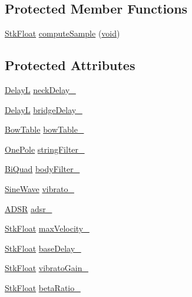 \subsection*{Protected Member Functions}
\begin{DoxyCompactItemize}
\item 
\hyperlink{namespace_nyq_a044fa20a706520a617bbbf458a7db7e4}{Stk\+Float} \hyperlink{class_nyq_1_1_bowed_a879b9d440f72f44acda7f54dba3a1b71}{compute\+Sample} (\hyperlink{sound_8c_ae35f5844602719cf66324f4de2a658b3}{void})
\end{DoxyCompactItemize}
\subsection*{Protected Attributes}
\begin{DoxyCompactItemize}
\item 
\hyperlink{class_nyq_1_1_delay_l}{DelayL} \hyperlink{class_nyq_1_1_bowed_aa170223b11caa79fa4fd5af028eeeff8}{neck\+Delay\+\_\+}
\item 
\hyperlink{class_nyq_1_1_delay_l}{DelayL} \hyperlink{class_nyq_1_1_bowed_a0dc60cfb71d8051ffb776892a16b0361}{bridge\+Delay\+\_\+}
\item 
\hyperlink{class_nyq_1_1_bow_table}{Bow\+Table} \hyperlink{class_nyq_1_1_bowed_ad472d5c094c51eb451599f906e63626d}{bow\+Table\+\_\+}
\item 
\hyperlink{class_nyq_1_1_one_pole}{One\+Pole} \hyperlink{class_nyq_1_1_bowed_a3eb5d4a82da3fbc6df9936facc887296}{string\+Filter\+\_\+}
\item 
\hyperlink{class_nyq_1_1_bi_quad}{Bi\+Quad} \hyperlink{class_nyq_1_1_bowed_a6f04c406eeb259a546ddcbbbed39c1d1}{body\+Filter\+\_\+}
\item 
\hyperlink{class_nyq_1_1_sine_wave}{Sine\+Wave} \hyperlink{class_nyq_1_1_bowed_a7f52ec95ad039f2b425d762b04f11051}{vibrato\+\_\+}
\item 
\hyperlink{class_nyq_1_1_a_d_s_r}{A\+D\+SR} \hyperlink{class_nyq_1_1_bowed_af619b9a4fed6ca5c79a33bd3cb00940a}{adsr\+\_\+}
\item 
\hyperlink{namespace_nyq_a044fa20a706520a617bbbf458a7db7e4}{Stk\+Float} \hyperlink{class_nyq_1_1_bowed_aa806fffc46ce38d6f87725ece1e1fc6a}{max\+Velocity\+\_\+}
\item 
\hyperlink{namespace_nyq_a044fa20a706520a617bbbf458a7db7e4}{Stk\+Float} \hyperlink{class_nyq_1_1_bowed_a4b44dfe1a617a2b06b6b180b8422d792}{base\+Delay\+\_\+}
\item 
\hyperlink{namespace_nyq_a044fa20a706520a617bbbf458a7db7e4}{Stk\+Float} \hyperlink{class_nyq_1_1_bowed_aabf8613e7f12b0f62110fa8d6e64d1a0}{vibrato\+Gain\+\_\+}
\item 
\hyperlink{namespace_nyq_a044fa20a706520a617bbbf458a7db7e4}{Stk\+Float} \hyperlink{class_nyq_1_1_bowed_a626766a3c1de1d4278333fc5449c24f8}{beta\+Ratio\+\_\+}
\end{DoxyCompactItemize}
